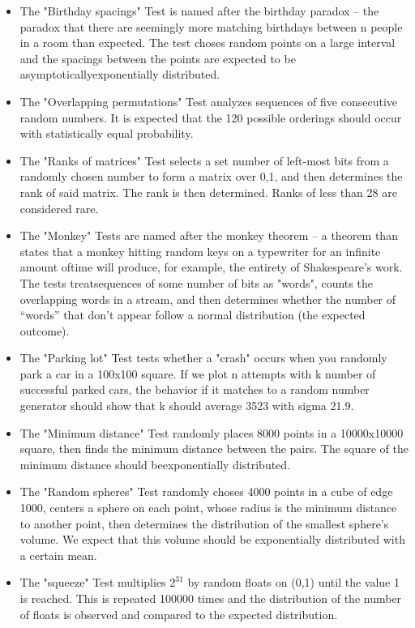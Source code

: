 \documentclass[conference]{IEEEtran}
\begin{document}
\begin{itemize}
  \item The "Birthday spacings" Test is named after the birthday paradox – the paradox that there are seemingly more matching birthdays between n people in a room than expected. The test choses random points on a large interval and the spacings between the points are expected to be asymptoticallyexponentially distributed.
  \item The "Overlapping permutations" Test analyzes sequences of five consecutive random numbers. It is expected that the 120 possible orderings should occur with statistically equal probability.
  \item The "Ranks of matrices" Test selects a set number of left-most bits from a randomly chosen number to form a matrix over {0,1}, and then determines the rank of said matrix. The rank is then determined. Ranks of less than 28 are considered rare.
  \item The "Monkey" Tests are named after the monkey theorem – a theorem than states that a monkey hitting random keys on a typewriter for an infinite amount oftime will produce, for example, the entirety of Shakespeare’s work. The tests treatsequences of some number of bits as "words", counts the overlapping words in a stream, and then determines whether the number of “words” that don’t appear follow a normal distribution (the expected outcome).
  \item The "Parking lot" Test tests whether a "crash" occurs when you randomly park a car in a 100x100 square. If we plot n attempts with k number of successful parked cars, the behavior if it matches to a random number generator should show that k should average 3523 with sigma 21.9.
  \item The "Minimum distance" Test randomly places 8000 points in a 10000x10000 square, then finds the minimum distance between the pairs. The square of the minimum distance should beexponentially distributed.
  \item The "Random spheres" Test randomly choses 4000 points in a cube of edge 1000, centers a sphere on each point, whose radius is the minimum distance to another point, then determines the distribution of the smallest sphere’s volume. We expect that this volume should be exponentially distributed with a certain mean.
  \item The "squeeze" Test multiplies $2^{31}$ by random floats on (0,1) until the value 1 is reached. This is repeated 100000 times and the distribution of the number of floats is observed and compared to the expected distribution. 

\end{itemize}
\end{document}
